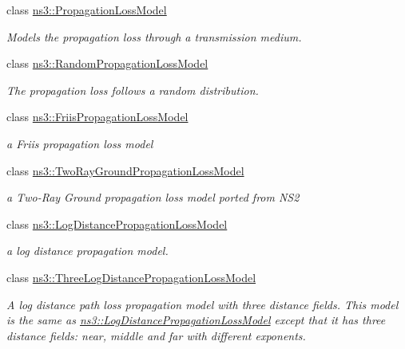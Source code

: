 \begin{DoxyCompactItemize}
\item 
class \hyperlink{classns3_1_1PropagationLossModel}{ns3\+::\+Propagation\+Loss\+Model}
\begin{DoxyCompactList}\small\item\em Models the propagation loss through a transmission medium. \end{DoxyCompactList}\item 
class \hyperlink{classns3_1_1RandomPropagationLossModel}{ns3\+::\+Random\+Propagation\+Loss\+Model}
\begin{DoxyCompactList}\small\item\em The propagation loss follows a random distribution. \end{DoxyCompactList}\item 
class \hyperlink{classns3_1_1FriisPropagationLossModel}{ns3\+::\+Friis\+Propagation\+Loss\+Model}
\begin{DoxyCompactList}\small\item\em a Friis propagation loss model \end{DoxyCompactList}\item 
class \hyperlink{classns3_1_1TwoRayGroundPropagationLossModel}{ns3\+::\+Two\+Ray\+Ground\+Propagation\+Loss\+Model}
\begin{DoxyCompactList}\small\item\em a Two-\/\+Ray Ground propagation loss model ported from N\+S2 \end{DoxyCompactList}\item 
class \hyperlink{classns3_1_1LogDistancePropagationLossModel}{ns3\+::\+Log\+Distance\+Propagation\+Loss\+Model}
\begin{DoxyCompactList}\small\item\em a log distance propagation model. \end{DoxyCompactList}\item 
class \hyperlink{classns3_1_1ThreeLogDistancePropagationLossModel}{ns3\+::\+Three\+Log\+Distance\+Propagation\+Loss\+Model}
\begin{DoxyCompactList}\small\item\em A log distance path loss propagation model with three distance fields. This model is the same as \hyperlink{classns3_1_1LogDistancePropagationLossModel}{ns3\+::\+Log\+Distance\+Propagation\+Loss\+Model} except that it has three distance fields\+: near, middle and far with different exponents. \end{DoxyCompactList}\item 

\end{DoxyCompactItemize}
